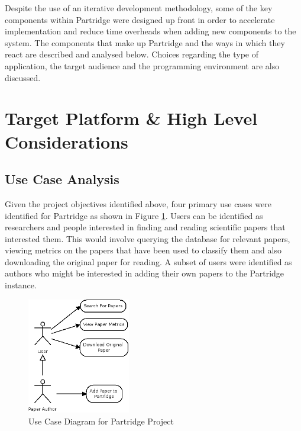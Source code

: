%
%

Despite the use of an iterative development methodology, some of the key
components within Partridge were designed up front in order to accelerate
implementation and reduce time overheads when adding new components to the
system. The components that make up Partridge and the ways in which they react
are described and analysed below. Choices regarding the type of application,
the target audience and the programming environment are also discussed.


\section{ Target Platform \& High Level Considerations }

\subsection{Use Case Analysis}

Given the project objectives identified above, four primary use cases were
identified for Partridge as shown in Figure \ref{fig:use_cases}. Users can be
identified as researchers and people interested in finding and reading
scientific papers that interested them. This would involve querying the
database for relevant papers, viewing metrics on the papers that have been used
to classify them and also downloading the original paper for reading. A subset
of users were identified as authors who might be interested in adding their own
papers to the Partridge instance.

\begin{figure}[!h]
\centering
\includegraphics[width=0.4\textwidth]{images/design/use_cases.png}
\caption{Use Case Diagram for Partridge Project}
\label{fig:use_cases}
\end{figure}

